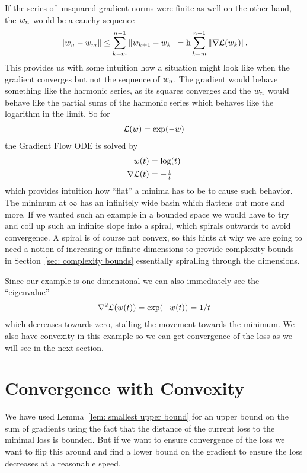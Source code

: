 If the series of unsquared gradient norms were finite as well on the other hand,
the \(w_n\) would be a cauchy sequence
%
\begin{align*}
	\|w_n - w_m \|
	\le \sum_{k=m}^{n-1} \|w_{k+1} - w_k\|
	= \text{h} \sum_{k=m}^{n-1} \|\nabla \mathcal{L}(w_k)\|.
\end{align*}
%
This provides us with some intuition how a situation might look like when the
gradient converges but not the sequence of \(w_n\). The gradient would
behave something like the harmonic series, as its squares converges and the
\(w_n\) would behave like the partial sums of the harmonic series which
behaves like the logarithm in the limit. So for
%
\begin{align*}
	\mathcal{L}(w) = \exp(-w)
\end{align*}
%
the Gradient Flow ODE is solved by
%
\begin{align*}
	w(t) &= \log(t)\\
	\nabla \mathcal{L}(t) &= -\tfrac1t
\end{align*}
%
which provides intuition how ``flat'' a minima has to be to cause such behavior.
The minimum at \(\infty\) has an infinitely wide basin which flattens out
more and more. If we wanted such an example in a bounded space we would have
to try and coil up such an infinite slope into a spiral, which spirals outwards
to avoid convergence. A spiral is of course not convex, so this hints
at why we are going to need a notion of increasing or infinite dimensions to
provide complexity bounds in Section~\ref{sec: complexity bounds} essentially
spiralling through the dimensions.

Since our example is one dimensional we can also immediately see the ``eigenvalue''
%
\begin{align*}
	\nabla^2 \mathcal{L}(w(t)) = \exp(-w(t)) = 1/t
\end{align*}
%
which decreases towards zero, stalling the movement towards the minimum.
We also have convexity in this example so we can get convergence of the loss
as we will see in the next section.

\section{Convergence with Convexity}\label{sec: convex convergence theorems}

We have used Lemma~\ref{lem: smallest upper bound} for an upper bound on the
sum of gradients using the fact that the distance of the current loss to the
minimal loss is bounded. But if we want to ensure convergence of the loss we
want to flip this around and find a lower bound on the gradient to ensure
the loss decreases at a reasonable speed.

